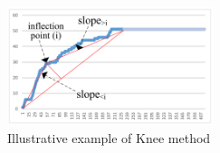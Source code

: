 \begin{figure}[h!]
\centering
\includegraphics[width=6cm]{figure/knee.png}
\caption{Illustrative example of Knee method}
\label{fig:knee}
\end{figure}

